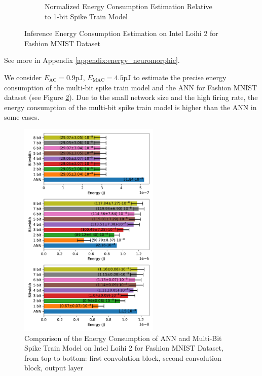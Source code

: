 \begin{figure}[!htpb]
\begin{subfigure}[H]{0.48\textwidth}
                \caption{Normalized Energy Consumption Estimation Relative to 1-bit Spike Train Model}
            \end{subfigure}
            \caption{Inference Energy Consumption Estimation on Intel Loihi 2 for Fashion MNIST Dataset}
            \label{fig:inference_energy_nh}
        \end{figure}

        See more in Appendix \ref{appendix:energy_neuromorphic}.

        We consider $E_{\text{AC}}=0.9\text{pJ}$, $E_{\text{MAC}}=4.5\text{pJ}$ \cite{6757323} to estimate the precise energy consumption of the multi-bit spike train model and the ANN for Fashion MNIST dataset (see Figure \ref{fig:energy_ann_vs_snn}). Due to the small network size and the high firing rate, the energy consumption of the multi-bit spike train model is higher than the ANN in some cases.
        \begin{figure}[!htpb]
            \centering
            \includegraphics[width=0.6\textwidth]{../standard/FashionMNIST/plots/fashionmnist_energy_ann_vs_snn.pdf}
            \caption{Comparison of the Energy Consumption of ANN and Multi-Bit Spike Train Model on Intel Loihi 2 for Fashion MNIST Dataset, from top to bottom: first convolution block, second convolution block, output layer}
            \label{fig:energy_ann_vs_snn}
        \end{figure}

